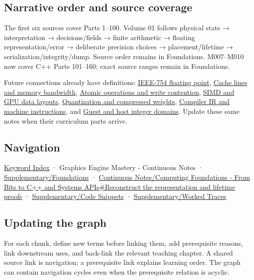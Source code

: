 \subsection{Narrative order and source coverage}\label{appendix-4ad47bdd269a-narrative-order-and-source-coverage}

The first six sources cover Parts 1--100. Volume 01 follows physical state → interpretation → decisions/fields → finite arithmetic → floating representation/error → deliberate precision choices → placement/lifetime → serialization/integrity/dump. Source order remains in Foundations. M007--M010 now cover C++ Parts 101--160; exact source ranges remain in Foundations.

Future connections already have definitions: \hyperref[appendix-343615f49ddf]{IEEE-754 floating point}, \hyperref[appendix-e4ccdbab8320]{Cache lines and memory bandwidth}, \hyperref[appendix-e12d1b03fefb]{Atomic operations and write contention}, \hyperref[appendix-3c7b1a56de01]{SIMD and GPU data layouts}, \hyperref[appendix-fdc7879e8bf2]{Quantization and compressed weights}, \hyperref[appendix-942ad41afb30]{Compiler IR and machine instructions}, and \hyperref[appendix-33e7a011b684]{Guest and host integer domains}. Update these same notes when their curriculum parts arrive.

\subsection{Navigation}\label{appendix-4ad47bdd269a-navigation}

\hyperref[appendix-a6d556a4ef50]{Keyword Index} · {Graphics Engine Mastery - Continuous Notes} · \hyperref[appendix-fd090d982a15]{Supplementary/Foundations} · \hyperref[01-foundations-i-ch010-reconstruct-the-representation-and-lifetime-proofs]{Continuous Notes/Computing Foundations - From Bits to C++ and Systems APIs\#Reconstruct the representation and lifetime proofs} · \hyperref[appendix-4e2236f53445]{Supplementary/Code Snippets} · \hyperref[appendix-92ff77d4dfdc]{Supplementary/Worked Traces}

\subsection{Updating the graph}\label{appendix-4ad47bdd269a-updating-the-graph}

For each chunk, define new terms before linking them, add prerequisite reasons, link downstream uses, and back-link the relevant teaching chapter. A shared source link is navigation; a prerequisite link explains learning order. The graph can contain navigation cycles even when the prerequisite relation is acyclic.

